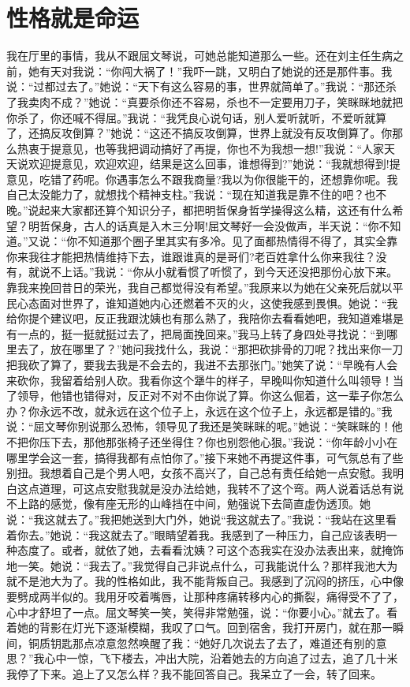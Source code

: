 \documentclass[12pt,oneside]{book}
\begin{document}
\chapter{性格就是命运}
我在厅里的事情，我从不跟屈文琴说，可她总能知道那么一些。还在刘主任生病之前，她有天对我说：``你闯大祸了！''我吓一跳，又明白了她说的还是那件事。我说：``过都过去了。''她说：``天下有这么容易的事，世界就简单了。''我说：``那还杀了我卖肉不成？''她说：``真要杀你还不容易，杀也不一定要用刀子，笑眯眯地就把你杀了，你还喊不得屈。''我说：``我凭良心说句话，别人爱听就听，不爱听就算了，还搞反攻倒算？''她说：``这还不搞反攻倒算，世界上就没有反攻倒算了。你那么热衷于提意见，也等我把调动搞好了再提，你也不为我想一想!''我说：``人家天天说欢迎提意见，欢迎欢迎，结果是这么回事，谁想得到?''她说：``我就想得到!提意见，吃错了药呢。你遇事怎么不跟我商量?我以为你很能干的，还想靠你呢。我自己太没能力了，就想找个精神支柱。''我说：``现在知道我是靠不住的吧？也不晚。''说起来大家都还算个知识分子，都把明哲保身哲学操得这么精，这还有什么希望？明哲保身，古人的话真是入木三分啊!屈文琴好一会没做声，半天说：``你不知道。''又说：``你不知道那个圈子里其实有多冷。见了面都热情得不得了，其实全靠你来我往才能把热情维持下去，谁跟谁真的是哥们?老百姓拿什么你来我往？没有，就说不上话。''我说：``你从小就看惯了听惯了，到今天还没把那份心放下来。靠我来挽回昔日的荣光，我自己都觉得没有希望。''我原来以为她在父亲死后就以平民心态面对世界了，谁知道她内心还燃着不灭的火，这使我感到畏惧。她说：``我给你提个建议吧，反正我跟沈姨也有那么熟了，我陪你去看看她吧，我知道难堪是有一点的，挺一挺就挺过去了，把局面挽回来。''我马上转了身四处寻找说：``到哪里去了，放在哪里了？''她问我找什么，我说：``那把砍排骨的刀呢？找出来你一刀把我砍了算了，要我去我是不会去的，我进不去那张门。''她笑了说：``早晚有人会来砍你，我留着给别人砍。我看你这个犟牛的样子，早晚叫你知道什么叫领导！当了领导，他错也错得对，反正对不对不由你说了算。你这么倔着，这一辈子你怎么办？你永远不改，就永远在这个位子上，永远在这个位子上，永远都是错的。''我说：``屈文琴你别说那么恐怖，领导见了我还是笑眯眯的呢。''她说：``笑眯眯的！他不把你压下去，那他那张椅子还坐得住？你也别怨他心狠。''我说：``你年龄小小在哪里学会这一套，搞得我都有点怕你了。''接下来她不再提这件事，可气氛总有了些别扭。我想着自己是个男人吧，女孩不高兴了，自己总有责任给她一点安慰。我明白这点道理，可这点安慰我就是没办法给她，我转不了这个弯。两人说着话总有说不上路的感觉，像有座无形的山峰挡在中间，勉强说下去简直虚伪透顶。她说：``我这就去了。''我把她送到大门外，她说``我这就去了。''我说：``我站在这里看着你去。''她说：``我这就去了。''眼睛望着我。我感到了一种压力，自己应该表明一种态度了。或者，就依了她，去看看沈姨？可这个态我实在没办法表出来，就掩饰地一笑。她说：``我去了。''我觉得自己非说点什么，可我能说什么？那样我池大为就不是池大为了。我的性格如此，我不能背叛自己。我感到了沉闷的挤压，心中像要劈成两半似的。我用牙咬着嘴唇，让那种疼痛转移内心的撕裂，痛得受不了了，心中才舒坦了一点。屈文琴笑一笑，笑得非常勉强，说：``你要小心。''就去了。看着她的背影在灯光下逐渐模糊，我叹了口气。回到宿舍，我打开房门，就在那一瞬间，铜质钥匙那点凉意忽然唤醒了我：``她好几次说去了去了，难道还有别的意思？''我心中一惊，飞下楼去，冲出大院，沿着她去的方向追了过去，追了几十米我停了下来。追上了又怎么样？我不能回答自己。我呆立了一会，转了回来。
\end{document}
